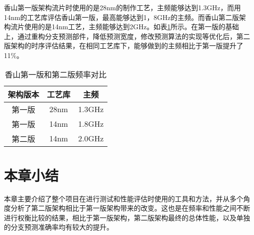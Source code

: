 
香山第一版架构流片时使用的是28nm的制作工艺，主频能够达到1.3GHz，而用14nm的工艺库评估香山第一版，最高能够达到1，8GHz的主频。而香山第二版架构流片使用的是14nm工艺，主频能够达到2GHz。如表\ref{tb:table3}所示。在第一版的基础上，通过重构分支预测部件，降低预测宽度，修改预测算法的实现等优化后，第二版架构的时序评估结果，在相同工艺库下，能够做到的主频相比于第一版提升了11\%。

\begin{table}[!h]
	\caption{香山第一版和第二版频率对比}
	\label{tb:table3}
	\centering
	\begin{tabular}{|c|c|c|}
		\hline
		架构版本   & 工艺库   & 主频   \\ \hline
		第一版 & 28nm & 1.3GHz \\ \hline
		第一版 & 14nm & 1.8GHz \\ \hline
		第二版 & 14nm & 2.0GHz \\ \hline
	\end{tabular}
\end{table}


\section{本章小结}

本章主要介绍了整个项目在进行测试和性能评估时使用的工具和方法，并从多个角度分析了第二版架构相比于第一版架构带来的改变。这也是在频率和性能之间不断进行权衡比较的结果，相比于第一版架构，第二版架构最终的总体性能，以及单独的分支预测准确率均有较大的提升。